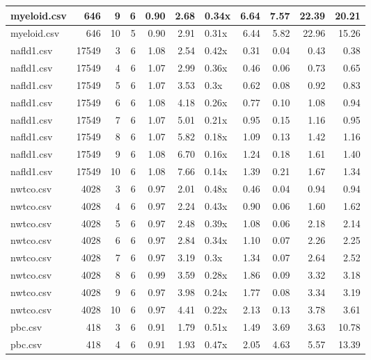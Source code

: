 \begin{table}[ht]
\begin{tabular}{lrrrrrlrrrr}
   \hline
myeloid.csv & 646 &   9 &   6 & 0.90 & 2.68 & 0.34x & 6.64 & 7.57 & 22.39 & 20.21 \\ 
   \hline
myeloid.csv & 646 &  10 &   5 & 0.90 & 2.91 & 0.31x & 6.44 & 5.82 & 22.96 & 15.26 \\ 
   \hline
nafld1.csv & 17549 &   3 &   6 & 1.08 & 2.54 & 0.42x & 0.31 & 0.04 & 0.43 & 0.38 \\ 
   \hline
nafld1.csv & 17549 &   4 &   6 & 1.07 & 2.99 & 0.36x & 0.46 & 0.06 & 0.73 & 0.65 \\ 
   \hline
nafld1.csv & 17549 &   5 &   6 & 1.07 & 3.53 & 0.3x & 0.62 & 0.08 & 0.92 & 0.83 \\ 
   \hline
nafld1.csv & 17549 &   6 &   6 & 1.08 & 4.18 & 0.26x & 0.77 & 0.10 & 1.08 & 0.94 \\ 
   \hline
nafld1.csv & 17549 &   7 &   6 & 1.07 & 5.01 & 0.21x & 0.95 & 0.15 & 1.16 & 0.95 \\ 
   \hline
nafld1.csv & 17549 &   8 &   6 & 1.07 & 5.82 & 0.18x & 1.09 & 0.13 & 1.42 & 1.16 \\ 
   \hline
nafld1.csv & 17549 &   9 &   6 & 1.08 & 6.70 & 0.16x & 1.24 & 0.18 & 1.61 & 1.40 \\ 
   \hline
nafld1.csv & 17549 &  10 &   6 & 1.08 & 7.66 & 0.14x & 1.39 & 0.21 & 1.67 & 1.34 \\ 
   \hline
nwtco.csv & 4028 &   3 &   6 & 0.97 & 2.01 & 0.48x & 0.46 & 0.04 & 0.94 & 0.94 \\ 
   \hline
nwtco.csv & 4028 &   4 &   6 & 0.97 & 2.24 & 0.43x & 0.90 & 0.06 & 1.60 & 1.62 \\ 
   \hline
nwtco.csv & 4028 &   5 &   6 & 0.97 & 2.48 & 0.39x & 1.08 & 0.06 & 2.18 & 2.14 \\ 
   \hline
nwtco.csv & 4028 &   6 &   6 & 0.97 & 2.84 & 0.34x & 1.10 & 0.07 & 2.26 & 2.25 \\ 
   \hline
nwtco.csv & 4028 &   7 &   6 & 0.97 & 3.19 & 0.3x & 1.34 & 0.07 & 2.64 & 2.52 \\ 
   \hline
nwtco.csv & 4028 &   8 &   6 & 0.99 & 3.59 & 0.28x & 1.86 & 0.09 & 3.32 & 3.18 \\ 
   \hline
nwtco.csv & 4028 &   9 &   6 & 0.97 & 3.98 & 0.24x & 1.77 & 0.08 & 3.34 & 3.19 \\ 
   \hline
nwtco.csv & 4028 &  10 &   6 & 0.97 & 4.41 & 0.22x & 2.13 & 0.13 & 3.78 & 3.61 \\ 
   \hline
pbc.csv & 418 &   3 &   6 & 0.91 & 1.79 & 0.51x & 1.49 & 3.69 & 3.63 & 10.78 \\ 
   \hline
pbc.csv & 418 &   4 &   6 & 0.91 & 1.93 & 0.47x & 2.05 & 4.63 & 5.57 & 13.39 \\ 

\end{tabular}
\end{table}
